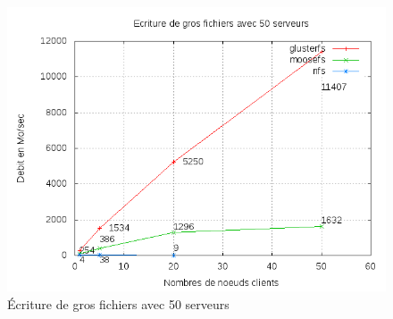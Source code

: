 \documentclass[12pt]{report}
\begin{document}
\begin{figure}[H]
\begin{center}
\includegraphics[bb=0 0 640 480,width=12cm]{images/srv50wb2.png}
\caption{Écriture de gros fichiers avec 50 serveurs}
\end{center}
\end{figure} 
\end{document}
